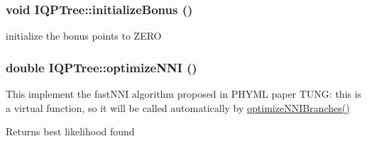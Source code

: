 \hypertarget{classIQPTree_ad617c01926a2efbdf1c64b025edddccc}{
\subsubsection[{initializeBonus}]{\setlength{\rightskip}{0pt plus 5cm}void IQPTree::initializeBonus ()}}
\label{classIQPTree_ad617c01926a2efbdf1c64b025edddccc}
initialize the bonus points to ZERO \hypertarget{classIQPTree_a8d1a63f976a3a219bc8a23ed356e1d65}{
\subsubsection[{optimizeNNI}]{\setlength{\rightskip}{0pt plus 5cm}double IQPTree::optimizeNNI ()}}
\label{classIQPTree_a8d1a63f976a3a219bc8a23ed356e1d65}
This implement the fastNNI algorithm proposed in PHYML paper TUNG: this is a virtual function, so it will be called automatically by \hyperlink{classPhyloTree_acef313906a2021de5de2eb87226a202d}{optimizeNNIBranches()} \begin{DoxyReturn}{Returns}
best likelihood found 
\end{DoxyReturn}


